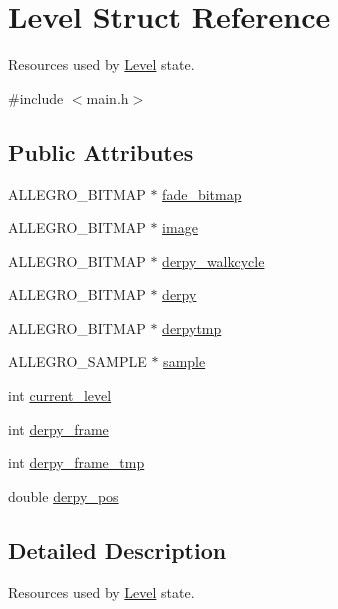 \hypertarget{structLevel}{\section{\-Level \-Struct \-Reference}
\label{structLevel}
}


\-Resources used by \hyperlink{structLevel}{\-Level} state.  




{\ttfamily \#include $<$main.\-h$>$}

\subsection*{\-Public \-Attributes}
\begin{DoxyCompactItemize}
\item 
\-A\-L\-L\-E\-G\-R\-O\-\_\-\-B\-I\-T\-M\-A\-P $\ast$ \hyperlink{structLevel_a1a9629222f6536790772ad7af5d2413c}{fade\-\_\-bitmap}
\item 
\-A\-L\-L\-E\-G\-R\-O\-\_\-\-B\-I\-T\-M\-A\-P $\ast$ \hyperlink{structLevel_a29a3fe4b6d80ae62843840aa6afa0596}{image}
\item 
\-A\-L\-L\-E\-G\-R\-O\-\_\-\-B\-I\-T\-M\-A\-P $\ast$ \hyperlink{structLevel_ab6a78c50cda8424f722ca249f5466f67}{derpy\-\_\-walkcycle}
\item 
\-A\-L\-L\-E\-G\-R\-O\-\_\-\-B\-I\-T\-M\-A\-P $\ast$ \hyperlink{structLevel_ae33832497116b7a0c184959bbde21ee5}{derpy}
\item 
\-A\-L\-L\-E\-G\-R\-O\-\_\-\-B\-I\-T\-M\-A\-P $\ast$ \hyperlink{structLevel_ac21ed7629a60287bf8612f98abd3d9b6}{derpytmp}
\item 
\-A\-L\-L\-E\-G\-R\-O\-\_\-\-S\-A\-M\-P\-L\-E $\ast$ \hyperlink{structLevel_a234fa7b9ec35dd360e4e3c48a944fc7d}{sample}
\item 
int \hyperlink{structLevel_a1ba3ee0104c912dde5d6e70fee889512}{current\-\_\-level}
\item 
int \hyperlink{structLevel_aab3e7d9746c741ce8e1a76df13be7c53}{derpy\-\_\-frame}
\item 
int \hyperlink{structLevel_aa6a30e7b31e2300936f8e97890e1817c}{derpy\-\_\-frame\-\_\-tmp}
\item 
double \hyperlink{structLevel_a2bc3affc5c71ac8f6b9b775cefac0444}{derpy\-\_\-pos}
\end{DoxyCompactItemize}


\subsection{\-Detailed \-Description}
\-Resources used by \hyperlink{structLevel}{\-Level} state. 

